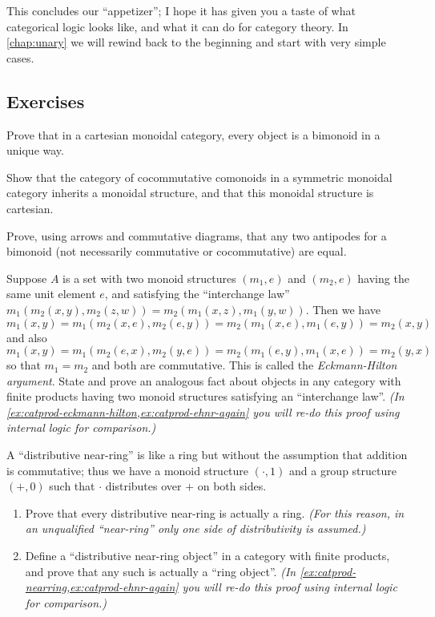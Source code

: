 This concludes our ``appetizer''; I hope it has given you a taste of what categorical logic looks like, and what it can do for category theory.
In \cref{chap:unary} we will rewind back to the beginning and start with very simple cases.

\subsection*{Exercises}

\begin{ex}\label{ex:cartmon-bimon-uniq}
  Prove that in a cartesian monoidal category, every object is a bimonoid in a unique way.
\end{ex}

\begin{ex}\label{ex:ccmon-cart}
  Show that the category of cocommutative comonoids in a symmetric monoidal category inherits a monoidal structure, and that this monoidal structure is cartesian.
\end{ex}

\begin{ex}\label{ex:antipode}
  Prove, using arrows and commutative diagrams, that any two antipodes for a bimonoid (not necessarily commutative or cocommutative) are equal.
\end{ex}

\begin{ex}\label{ex:eckmann-hilton}
  Suppose $A$ is a set with two monoid structures $(m_1,e)$ and $(m_2,e)$ having the same unit element $e$, and satisfying the ``interchange law'' $m_1(m_2(x,y),m_2(z,w)) = m_2(m_1(x,z),m_1(y,w))$.
  Then we have
  \[ m_1(x,y) = m_1(m_2(x,e),m_2(e,y)) = m_2(m_1(x,e),m_1(e,y)) = m_2(x,y) \]
  and also
  \[ m_1(x,y) = m_1(m_2(e,x),m_2(y,e)) = m_2(m_1(e,y),m_1(x,e)) = m_2(y,x) \]
  so that $m_1=m_2$ and both are commutative.
  This is called the \emph{Eckmann-Hilton argument}.
  State and prove an analogous fact about objects in any category with finite products having two monoid structures satisfying an ``interchange law''.
  \textit{(In \cref{ex:catprod-eckmann-hilton,ex:catprod-ehnr-again} you will re-do this proof using internal logic for comparison.)}
\end{ex}

\begin{ex}\label{ex:near-ring}
  A ``distributive near-ring'' is like a ring but without the assumption that addition is commutative; thus we have a monoid structure $(\cdot,1)$ and a group structure $(+,0)$ such that $\cdot$ distributes over $+$ on both sides.
  \begin{enumerate}
  \item Prove that every distributive near-ring is actually a ring.
    \textit{(For this reason, in an unqualified ``near-ring'' only one side of distributivity is assumed.)}
  \item Define a ``distributive near-ring object'' in a category with finite products, and prove that any such is actually a ``ring object''.
    \textit{(In \cref{ex:catprod-nearring,ex:catprod-ehnr-again} you will re-do this proof using internal logic for comparison.)}
  \end{enumerate}
\end{ex}



